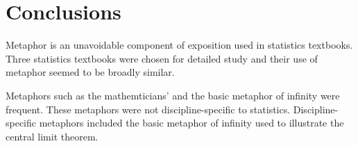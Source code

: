 \section{Conclusions}

Metaphor is an unavoidable component of exposition used in statistics
textbooks.  Three statistics textbooks were chosen for detailed study
and their use of metaphor seemed to be broadly similar.

Metaphors such as the mathemticians'  and the basic
metaphor of infinity were frequent.  These metaphors were not
discipline-specific to statistics.  Discipline-specific metaphors
included the basic metaphor of infinity used to illustrate the central
limit theorem.
